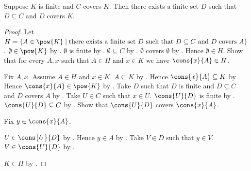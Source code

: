 \begin{theorem}\label{finite_covered_set_has_finite_subcover}
    Suppose $K$ is finite and $C$ covers $K$.
    Then there exists a finite set $D$ such that
        $D\subseteq C$ and $D$ covers $K$.
\end{theorem}
\begin{proof}
    Let $H=\{A\in\pow{K}\mid
        \text{there exists a finite set $D$ such that $D\subseteq C$ and
            $D$ covers $A$}\}$.
    $\emptyset\in\pow{K}$ by .
    $\emptyset$ is finite by .
    $\emptyset\subseteq C$ by .
    $\emptyset$ covers $\emptyset$ by .
    Hence $\emptyset\in H$.
    Show that for every $A,x$ such that $A\in H$ and $x\in K$ we have
        $\cons{x}{A}\in H$.
    \begin{subproof}
        Fix $A,x$.
        Assume $A\in H$ and $x\in K$.
        $A\subseteq K$ by .
        Hence $\cons{x}{A}\subseteq K$ by .
        Hence $\cons{x}{A}\in\pow{K}$ by .
        Take $D$ such that $D$ is finite and $D\subseteq C$ and
            $D$ covers $A$ by \auto.
        Take $U\in C$ such that $x\in U$.
        $\cons{U}{D}$ is finite by .
        $\cons{U}{D}\subseteq C$ by .
        Show that $\cons{U}{D}$ covers $\cons{x}{A}$.
        \begin{subproof}
            Fix $y\in\cons{x}{A}$.
            \begin{byCase}
                    $U\in\cons{U}{D}$ by .
                    Hence $y\in A$ by .
                    Take $V\in D$ such that $y\in V$.
                    $V\in\cons{U}{D}$ by .
            \end{byCase}
        \end{subproof}
    \end{subproof}
    $K\in H$ by .
\end{proof}
